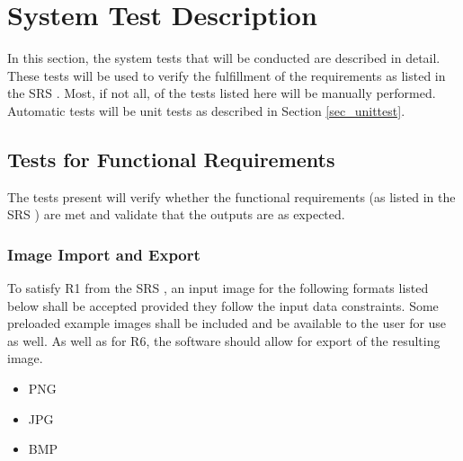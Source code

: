\documentclass[12pt, titlepage]{article}
\begin{document}

\section{System Test Description} \label{sec_systest_desc}

In this section, the system tests that will be conducted are described in detail. These tests
will be used to verify the fulfillment of the requirements as listed in the SRS \citep{SRS}.
Most, if not all, of the tests listed here will be manually performed. Automatic
tests will be unit tests as described in Section \ref{sec_unittest}.

\subsection{Tests for Functional Requirements}

The tests present will verify whether the functional requirements 
(as listed in the SRS \cite{SRS}) are met and validate that the outputs
are as expected.

\subsubsection{Image Import and Export} \label{subsec_img_io}

To satisfy R1 from the SRS \citep{SRS}, an input image for the following formats listed below shall be 
accepted provided they follow the input data constraints.
Some preloaded example images shall be included and be available to the user for use as well.
As well as for R6, the software should allow for export of the resulting image.

\begin{itemize}
  \item{PNG}
  \item{JPG}
  \item{BMP\\}
\end{itemize}
\end{document}
